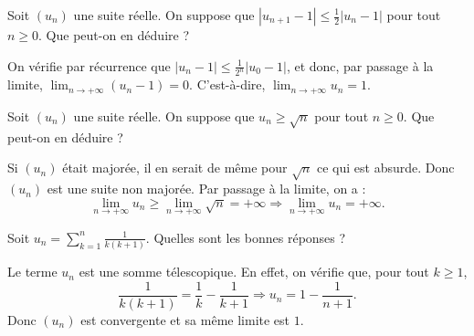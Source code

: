 \begin{question}
Soit $(u_n)$ une suite réelle. On suppose que $\displaystyle |u_{n+1}-1|\leq \frac{1}{2}|u_n-1|$ pour tout $n\geq 0$. Que peut-on en déduire ?
\begin{answers}  
\end{answers}
\begin{explanations}
On vérifie par récurrence que $\displaystyle |u_n-1|\leq \frac{1}{2^n}|u_0-1|$, et donc, par passage à la limite, $\displaystyle \lim _{n\to +\infty}(u_n-1)=0$. C'est-à-dire, $\displaystyle \lim _{n\to +\infty}u_n=1$.
\end{explanations}
\end{question}


\begin{question}
Soit $(u_n)$ une suite réelle. On suppose que $\displaystyle u_n\geq \sqrt{n}$ pour tout $n\geq 0$. Que peut-on en déduire ?
\begin{answers}
\end{answers}
\begin{explanations}
Si $(u_n)$ était majorée, il en serait de même pour $\sqrt{n}$ ce qui est absurde. Donc $(u_n)$ est une suite non majorée. Par passage à la limite, on a :
$$\lim _{n\to +\infty}u_n\geq \lim _{n\to +\infty}\sqrt{n}=+\infty\Rightarrow \displaystyle \lim _{n\to +\infty}u_n=+\infty.$$
\end{explanations}
\end{question}




\begin{question}
Soit $\displaystyle u_n=\sum _{k=1}^n\frac{1}{k(k+1)}$. Quelles sont les bonnes réponses ?
\begin{answers}  
\end{answers}
\begin{explanations}
Le terme $u_n$ est une somme télescopique. En effet, on vérifie que, pour tout $k\geq 1$,
$$\frac{1}{k(k+1)}=\frac{1}{k}-\frac{1}{k+1}\Rightarrow u_n=1-\frac{1}{n+1}.$$
Donc $(u_n)$ est convergente et sa même limite est $1$.
\end{explanations}
\end{question}




